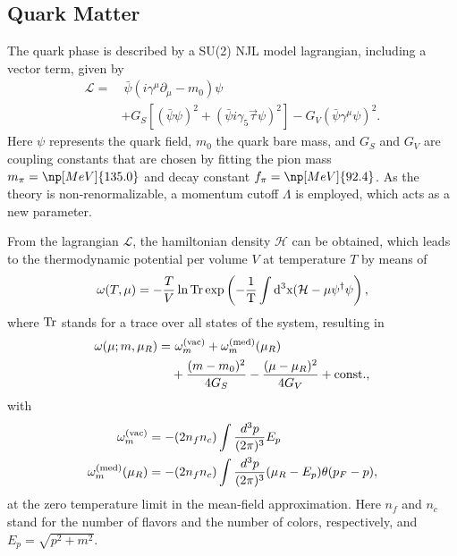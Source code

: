 \documentclass[prc, reprint, amsmath, floatfix, linenumbers,10pt]{revtex4-1}
\newcommand{\tr}{\rm{Tr}}
\begin{document}
\subsection{Quark Matter}

The quark phase is described by a SU(2) NJL model lagrangian, including a vector term, given by\cite{Buballa2005}
\begin{equation}\label{Eq:LagNJL-SU2-Bub}
\begin{split}
	\mathcal{L} =&~ \bar{\psi}(i\gamma^\mu\partial_\mu - m_0)\psi \\
	&+ G_S[(\bar{\psi}\psi)^2 + (\bar{\psi}i\gamma_5\vec{\tau}\psi)^2] - G_V(\bar{\psi}\gamma^\mu \psi)^2.
\end{split}
\end{equation}
%
Here $\psi$ represents the quark field, $m_0$ the quark bare mass, and $G_S$ and $G_V$ are coupling constants that are chosen by fitting the pion mass $m_\pi = \np[MeV]{135.0}$ and decay constant $f_\pi = \np[MeV]{92.4}$. As the theory is non-renormalizable, a momentum cutoff $\Lambda$ is employed, which acts as a new parameter.

From the lagrangian $\mathcal{L}$, the hamiltonian density $\mathcal{H}$ can be obtained, which leads to the thermodynamic potential per volume $V$ at temperature $T$ by means of
\begin{equation}
	\omega(T, \mu) = -\frac{T}{V} \ln \tr \exp\left(-\frac{1}{T}\int d^3x(\mathcal{H} - \mu\psi^\dagger\psi\right),
\end{equation}
%
where $\tr$ stands for a trace over all states of the system, resulting in \cite{Buballa1996}
\begin{equation}\label{Eq:Pot_Termo_Temp_zero}
\begin{split}
	\omega(\mu; m, \mu_R) =&~ \omega_m^{(\rm{vac})} + \omega_m^{(\rm{med})}(\mu_R) \\
	&+ \frac{(m - m_0)^2}{4G_S} - \frac{(\mu - \mu_R)^2}{4G_V} +  \textrm{const.},
\end{split}
\end{equation}
%
with
\begin{align}
	\omega_m^{(\rm{vac})} &= -(2 n_f n_c) \int \frac{d^3p}{(2\pi)^3} E_p\\
	\omega_m^{(\rm{med})}(\mu_R) &= - (2n_f n_c) \int\frac{d^3p}{(2 \pi)^3} (\mu_R - E_p) \theta(p_F -p),
\end{align}
%
at the zero temperature limit in the mean-field approximation. Here $n_f$ and $n_c$ stand for the number of flavors and the number of colors, respectively, and $E_p = \sqrt{p^2 + m^2}$.
\end{document}
